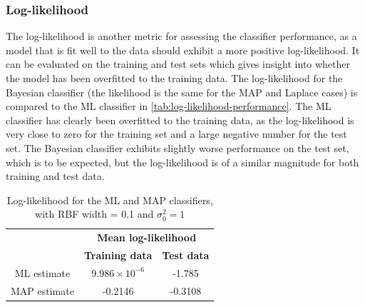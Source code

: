 \documentclass[a4paper]{article}
\begin{document}
    \subsubsection{Log-likelihood}
    The log-likelihood is another metric for assessing the classifier performance, as a model that is fit well to the data should exhibit a more positive log-likelihood.
    It can be evaluated on the training and test sets which gives insight into whether the model has been overfitted to the training data.
    The log-likelihood for the Bayesian classifier (the likelihood is the same for the MAP and Laplace cases) is compared to the ML classifier in \autoref{tab:log-likelihood-performance}.
    The ML classifier has clearly been overfitted to the training data, as the log-likelihood is very close to zero for the training set and a large negative number for the test set.
    The Bayesian classifier exhibits slightly worse performance on the test set, which is to be expected, but the log-likelihood is of a similar magnitude for both training and test data.
    \begin{table}[h]
        \centering
        \begin{tabular}{c c c}
            & \multicolumn{2}{c}{\textbf{Mean log-likelihood}} \\
            &  \textbf{Training data} & \textbf{Test data} \\
            \hline
            ML estimate & $9.986 \times 10^{-6}$ & -1.785 \\
            MAP estimate & -0.2146 & -0.3108
        \end{tabular}
        \caption{Log-likelihood for the ML and MAP classifiers, with RBF width = 0.1 and $\sigma_0^2=1$}
        \label{tab:log-likelihood-performance}
    \end{table}
\end{document}
